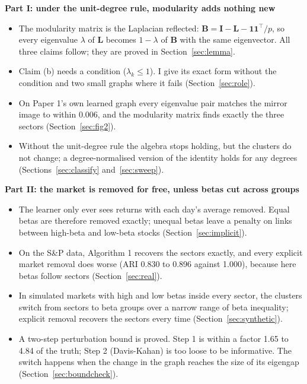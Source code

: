 \documentclass[11pt,a4paper]{article}
\newcommand{\Lap}{\mathbf{L}}
\newcommand{\Bmat}{\mathbf{B}}
\newcommand{\Imat}{\mathbf{I}}
\newcommand{\one}{\mathbf{1}}
\theoremstyle{remark}
\newenvironment{aside}[1]
 {\par\vspace{2.5mm}\begin{lrbox}{\asidebox}%
  \begin{minipage}{\dimexpr\textwidth-16pt\relax}\small\textbf{#1}\par\vspace{1mm}}
 {\end{minipage}\end{lrbox}%
  \noindent\setlength{\fboxsep}{7pt}\setlength{\fboxrule}{.4pt}%
  \fcolorbox{Rule}{Panel2}{\usebox{\asidebox}}\par\vspace{2.5mm}}
\begin{document}
\begin{aside}{Part I: under the unit-degree rule, modularity adds nothing new}
\begin{itemize}
\item The modularity matrix is the Laplacian reflected: $\Bmat=\Imat-\Lap-\one\one^\top/p$,
  so every eigenvalue $\lambda$ of $\Lap$ becomes $1-\lambda$ of $\Bmat$ with the same
  eigenvector. All three claims follow; they are proved in Section~\ref{sec:lemma}.
\item Claim (b) needs a condition ($\lambda_k\le1$). I give its exact form without the
  condition and two small graphs where it fails (Section~\ref{sec:role}).
\item On Paper 1's own learned graph every eigenvalue pair matches the mirror image to
  within $0.006$, and the modularity matrix finds exactly the three sectors
  (Section~\ref{sec:fig2}).
\item Without the unit-degree rule the algebra stops holding, but the clusters do not
  change; a degree-normalised version of the identity holds for any degrees
  (Sections~\ref{sec:classify} and~\ref{sec:sweep}).
\end{itemize}
\end{aside}
\begin{aside}{Part II: the market is removed for free, unless betas cut across groups}
\begin{itemize}
\item The learner only ever sees returns with each day's average removed. Equal betas
  are therefore removed exactly; unequal betas leave a penalty on links between
  high-beta and low-beta stocks (Section~\ref{sec:implicit}).
\item On the S\&P data, Algorithm 1 recovers the sectors exactly, and every explicit
  market removal does worse (ARI 0.830 to 0.896 against 1.000), because here betas
  follow sectors (Section~\ref{sec:real}).
\item In simulated markets with high and low betas inside every sector, the clusters
  switch from sectors to beta groups over a narrow range of beta inequality; explicit
  removal recovers the sectors every time (Section~\ref{sec:synthetic}).
\item A two-step perturbation bound is proved. Step 1 is within a factor 1.65 to 4.84
  of the truth; Step 2 (Davis-Kahan) is too loose to be informative. The switch happens
  when the change in the graph reaches the size of its eigengap (Section~\ref{sec:boundcheck}).
\end{itemize}
\end{aside}
\end{document}

